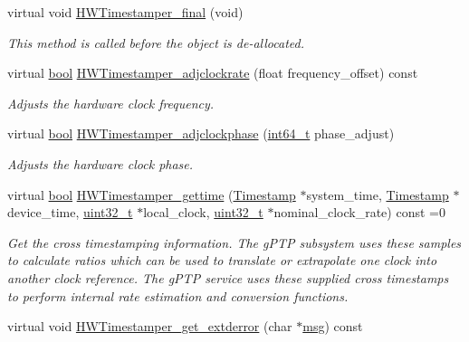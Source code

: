 \begin{DoxyCompactItemize}
virtual void \hyperlink{class_common_timestamper_a866fc2519a7b2a696e350ed05df53f90}{H\+W\+Timestamper\+\_\+final} (void)
\begin{DoxyCompactList}\small\item\em This method is called before the object is de-\/allocated. \end{DoxyCompactList}\item 
virtual \hyperlink{avb__gptp_8h_af6a258d8f3ee5206d682d799316314b1}{bool} \hyperlink{class_common_timestamper_a557b905a4f8bb20481c28c8dd33cfb21}{H\+W\+Timestamper\+\_\+adjclockrate} (float frequency\+\_\+offset) const 
\begin{DoxyCompactList}\small\item\em Adjusts the hardware clock frequency. \end{DoxyCompactList}\item 
virtual \hyperlink{avb__gptp_8h_af6a258d8f3ee5206d682d799316314b1}{bool} \hyperlink{class_common_timestamper_aa9470ea1623c3718913fbff1c55e3115}{H\+W\+Timestamper\+\_\+adjclockphase} (\hyperlink{parse_8c_a67a9885ef4908cb72ce26d75b694386c}{int64\+\_\+t} phase\+\_\+adjust)
\begin{DoxyCompactList}\small\item\em Adjusts the hardware clock phase. \end{DoxyCompactList}\item 
virtual \hyperlink{avb__gptp_8h_af6a258d8f3ee5206d682d799316314b1}{bool} \hyperlink{class_common_timestamper_a10b54d66a60067c0084748f955164073}{H\+W\+Timestamper\+\_\+gettime} (\hyperlink{class_timestamp}{Timestamp} $\ast$system\+\_\+time, \hyperlink{class_timestamp}{Timestamp} $\ast$device\+\_\+time, \hyperlink{parse_8c_a6eb1e68cc391dd753bc8ce896dbb8315}{uint32\+\_\+t} $\ast$local\+\_\+clock, \hyperlink{parse_8c_a6eb1e68cc391dd753bc8ce896dbb8315}{uint32\+\_\+t} $\ast$nominal\+\_\+clock\+\_\+rate) const =0
\begin{DoxyCompactList}\small\item\em Get the cross timestamping information. The g\+P\+TP subsystem uses these samples to calculate ratios which can be used to translate or extrapolate one clock into another clock reference. The g\+P\+TP service uses these supplied cross timestamps to perform internal rate estimation and conversion functions. \end{DoxyCompactList}\item 
virtual void \hyperlink{class_common_timestamper_a3b26113436dec73775d2cbc523a6e074}{H\+W\+Timestamper\+\_\+get\+\_\+extderror} (char $\ast$\hyperlink{openavb__log_8c_a0c7e58a50354c4a4d6dad428d0e47029}{msg}) const 

\end{DoxyCompactItemize}
